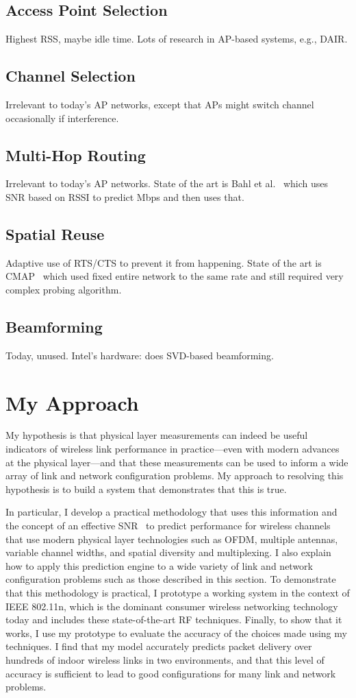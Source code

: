 \subsection{Access Point Selection}
Highest RSS, maybe idle time. Lots of research in AP-based systems, e.g., DAIR.
\subsection{Channel Selection}
Irrelevant to today's AP networks, except that APs might switch channel occasionally if interference.
\subsection{Multi-Hop Routing}
Irrelevant to today's AP networks. State of the art is Bahl et al.~\cite{Bahl_repeater} which uses SNR based on RSSI to predict Mbps and then uses that.
\subsection{Spatial Reuse}
Adaptive use of RTS/CTS to prevent it from happening. State of the art is CMAP~\cite{Vutukuru_CMAP} which used fixed entire network to the same rate and still required very complex probing algorithm.
\subsection{Beamforming}
Today, unused. Intel's hardware: does SVD-based beamforming.

\section{My Approach}
My hypothesis is that physical layer measurements can indeed be useful indicators of wireless link performance in practice---even with modern advances at the physical layer---and that these measurements can be used to inform a wide array of link and network configuration problems. My approach to resolving this hypothesis is to build a system that demonstrates that this is true.

In particular, I develop a practical methodology that uses this information and the concept of an effective SNR~\cite{Nanda_EffectiveSNR} to predict performance for wireless channels that use modern physical layer technologies such as OFDM, multiple antennas, variable channel widths, and spatial diversity and multiplexing. I also explain how to apply this prediction engine to a wide variety of link and network configuration problems such as those described in this section. To demonstrate that this methodology is practical, I prototype a working system in the context of IEEE 802.11n, which is the dominant consumer wireless networking technology today and includes these state-of-the-art RF techniques. Finally, to show that it works, I use my prototype to evaluate the accuracy of the choices made using my techniques. I find that my model accurately predicts packet delivery over hundreds of indoor wireless links in two environments, and that this level of accuracy is sufficient to lead to good configurations for many link and network problems.

